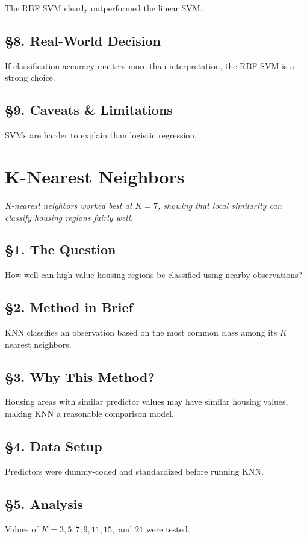 \documentclass[12pt]{report}
\begin{document}
The RBF SVM clearly outperformed the linear SVM.

\section*{\S8. Real-World Decision}
If classification accuracy matters more than interpretation, the RBF SVM is a strong choice.

\section*{\S9. Caveats \& Limitations}
SVMs are harder to explain than logistic regression.

\newpage

\chapter{K-Nearest Neighbors}

\begin{center}
\textit{K-nearest neighbors worked best at \(K=7\), showing that local similarity can classify housing regions fairly well.}
\end{center}

\section*{\S1. The Question}
How well can high-value housing regions be classified using nearby observations?

\section*{\S2. Method in Brief}
KNN classifies an observation based on the most common class among its \(K\) nearest neighbors.

\section*{\S3. Why This Method?}
Housing areas with similar predictor values may have similar housing values, making KNN a reasonable comparison model.

\section*{\S4. Data Setup}
Predictors were dummy-coded and standardized before running KNN.

\section*{\S5. Analysis}
Values of \(K = 3, 5, 7, 9, 11, 15,\) and \(21\) were tested.
\end{document}
